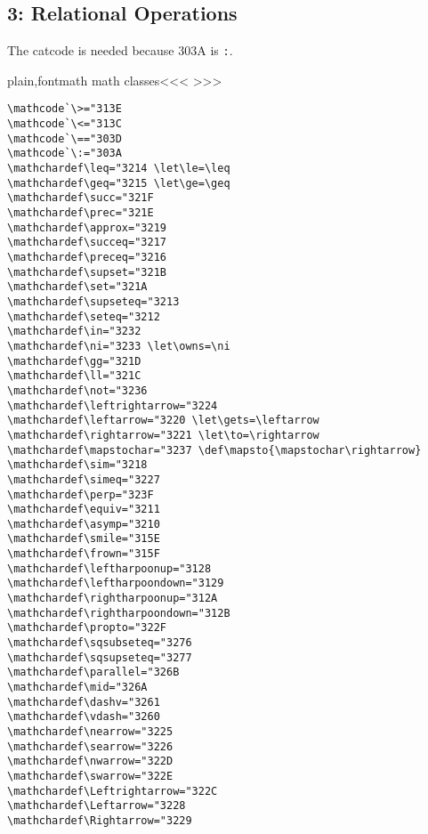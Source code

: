 {{{{{{\subsection{3: Relational Operations}

The catcode is needed because 303A is \verb':'.

\<plain,fontmath math classes\><<<
>>>




%

\begin{verbatim}
\mathcode`\>="313E
\mathcode`\<="313C
\mathcode`\=="303D
\mathcode`\:="303A
\mathchardef\leq="3214 \let\le=\leq
\mathchardef\geq="3215 \let\ge=\geq
\mathchardef\succ="321F
\mathchardef\prec="321E
\mathchardef\approx="3219
\mathchardef\succeq="3217
\mathchardef\preceq="3216
\mathchardef\supset="321B
\mathchardef\set="321A
\mathchardef\supseteq="3213
\mathchardef\seteq="3212
\mathchardef\in="3232
\mathchardef\ni="3233 \let\owns=\ni
\mathchardef\gg="321D
\mathchardef\ll="321C
\mathchardef\not="3236
\mathchardef\leftrightarrow="3224
\mathchardef\leftarrow="3220 \let\gets=\leftarrow
\mathchardef\rightarrow="3221 \let\to=\rightarrow
\mathchardef\mapstochar="3237 \def\mapsto{\mapstochar\rightarrow}
\mathchardef\sim="3218
\mathchardef\simeq="3227
\mathchardef\perp="323F
\mathchardef\equiv="3211
\mathchardef\asymp="3210
\mathchardef\smile="315E
\mathchardef\frown="315F
\mathchardef\leftharpoonup="3128
\mathchardef\leftharpoondown="3129
\mathchardef\rightharpoonup="312A
\mathchardef\rightharpoondown="312B
\mathchardef\propto="322F
\mathchardef\sqsubseteq="3276
\mathchardef\sqsupseteq="3277
\mathchardef\parallel="326B
\mathchardef\mid="326A
\mathchardef\dashv="3261
\mathchardef\vdash="3260
\mathchardef\nearrow="3225
\mathchardef\searrow="3226
\mathchardef\nwarrow="322D
\mathchardef\swarrow="322E
\mathchardef\Leftrightarrow="322C
\mathchardef\Leftarrow="3228
\mathchardef\Rightarrow="3229
\end{verbatim}


}}}}}}
